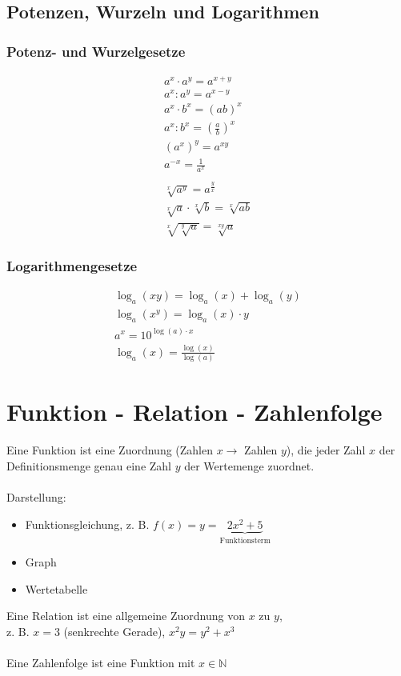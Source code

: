 \section{Potenzen, Wurzeln und Logarithmen}
\subsection{Potenz- und Wurzelgesetze}
\begin{gather*}
  a^x \cdot a^y = a^{x + y} \\
  a^x \colon a^y = a^{x - y} \\
  a^x \cdot b^x = (ab)^x \\
  a^x \colon b^x = (\frac{a}{b})^x \\
  (a^x)^y = a^{xy} \\
  a^{-x} = \frac{1}{a^x} \\\\
  \sqrt[x]{a^y} = a^\frac{y}{x} \\
  \sqrt[x]{a} \cdot \sqrt[x]{b} = \sqrt[x]{ab} \\
  \sqrt[x]{\sqrt[y]{a}} = \sqrt[xy]{a}
\end{gather*}
\subsection{Logarithmengesetze}
\begin{gather*}
  \log_a(xy) = \log_a(x) + \log_a(y) \\
  \log_a(x^y) = \log_a(x) \cdot y \\
  a^x = 10^{\log(a) \cdot x} \\
  \log_a(x) = \frac{\log(x)}{\log(a)}
\end{gather*}

\chapter{Funktion - Relation - Zahlenfolge}
Eine Funktion ist eine Zuordnung (Zahlen $x \rightarrow$ Zahlen $y$), die jeder Zahl $x$ der Definitionsmenge genau eine Zahl $y$ der Wertemenge zuordnet. \\\\
Darstellung:
\begin{itemize}
  \item Funktionsgleichung, z. B. $f(x) = y = \underbrace{2x^2 + 5}_\text{Funktionsterm}$
  \item Graph
  \item Wertetabelle
\end{itemize}
Eine Relation ist eine allgemeine Zuordnung von $x$ zu $y$,\\
z. B. $x = 3$ (senkrechte Gerade), $x^2y = y^2 + x^3$ \\\\
Eine Zahlenfolge ist eine Funktion mit $x \in \mathbb{N}$
